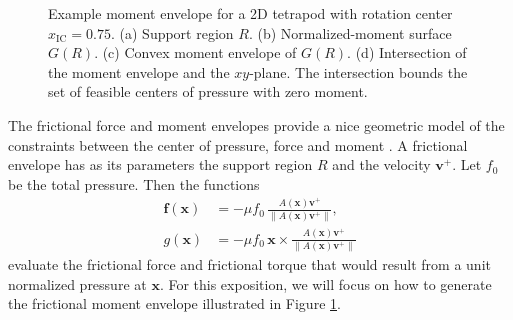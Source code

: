 \documentclass[conference]{IEEEtran}
\begin{document}
\begin{figure}[t]
\begin{subfigure}[b]{0.24\textwidth}
    \caption{}
  \end{subfigure}
  \caption{Example moment envelope for a 2D tetrapod with rotation
    center $x_{\text{IC}} = 0.75$. (a) Support region $R$. (b)
    Normalized-moment surface $G(R)$. (c) Convex moment envelope of
    $G(R)$. (d) Intersection of the moment envelope and the
    $xy$-plane. The intersection bounds the set of feasible centers of
    pressure with zero moment.}
  \label{fig:moment-envelope}
\end{figure}

The frictional force and moment envelopes provide a nice geometric
model of the constraints between the center of pressure, force and
moment \cite{Mason}. A frictional envelope has as its parameters the
support region $R$ and the velocity $\mathbf{v}^+$.  Let $f_0$ be the
total pressure. Then the functions
\begin{align}
  \mathbf{f}(\mathbf{x}) &= -\mu f_0\,\frac{A(\mathbf{x})\mathbf{v}^+}{\lVert A(\mathbf{x})\mathbf{v}^+ \rVert},\\
  g(\mathbf{x}) &= -\mu f_0\,\mathbf{x}\times \frac{A(\mathbf{x})\mathbf{v}^+}{\lVert A(\mathbf{x})\mathbf{v}^+ \rVert} \label{eq:unit-moment-at-x}
\end{align}
evaluate the frictional force and frictional torque that would result
from a unit normalized pressure at $\mathbf{x}$. For this exposition,
we will focus on how to generate the frictional moment envelope
illustrated in Figure \ref{fig:moment-envelope}.
\end{document}
